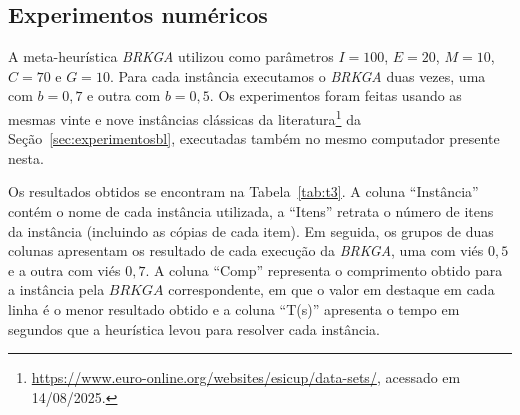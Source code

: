 \documentclass[12pt, openright, twoside, a4paper, english, brazilian]{USPSC-classe/USPSC}
\begin{document}
\subsection{Experimentos numéricos} \label{sec:experimentosBRKGA}

A meta-heurística {\it BRKGA} utilizou como parâmetros $I = 100$, $E = 20$, $M = 10$, $C = 70$ e $G = 10$. Para cada instância executamos o {\it BRKGA} duas vezes, uma com $b = 0,7$ e outra com $b = 0,5$. Os experimentos foram feitas usando as mesmas vinte e nove instâncias clássicas da literatura\footnote{\url{https://www.euro-online.org/websites/esicup/data-sets/}, acessado em 14/08/2025.} da Seção~\ref{sec:experimentosbl}, executadas também no mesmo computador presente nesta.

Os resultados obtidos se encontram na Tabela~\ref{tab:t3}. A coluna ``Instância'' contém o nome de cada instância utilizada, a ``Itens'' retrata o número de itens da instância (incluindo as cópias de cada item). Em seguida, os grupos de duas colunas apresentam os resultado de cada execução da {\it BRKGA}, uma com viés $0,5$ e a outra com viés $0,7$. A coluna ``Comp'' representa o comprimento obtido para a instância pela $BRKGA$ correspondente, em que o valor em destaque em cada linha é o menor resultado obtido e a coluna ``T(s)'' apresenta o tempo em segundos que a heurística levou para resolver cada instância.
\end{document}
